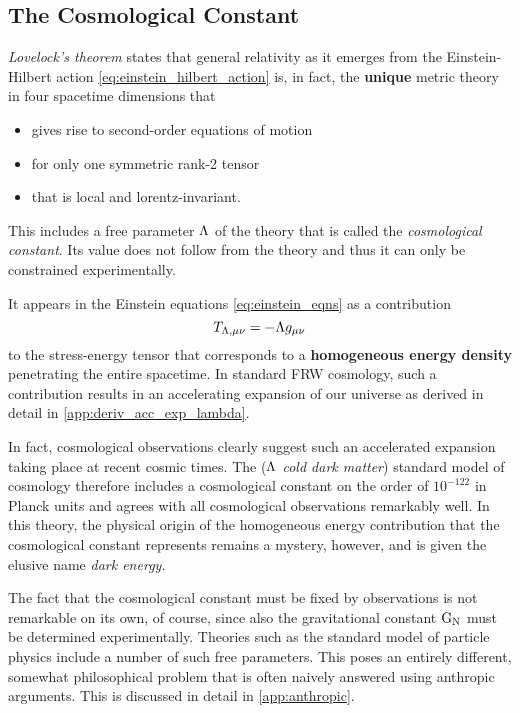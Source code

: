 \documentclass[parskip=half]{scrreprt}
\begin{document}
\subsection{The Cosmological Constant}\label{sec:cc_intro}

\emph{Lovelock's theorem}\label{sec:lovelock} states that general relativity as it emerges from the Einstein-Hilbert action \ref{eq:einstein_hilbert_action} is, in fact, the \textbf{unique} metric theory in four spacetime dimensions that 
\begin{itemize}
	\item gives rise to second-order equations of motion
	\item for only one symmetric rank-2 tensor
	\item that is local and lorentz-invariant.
\end{itemize}
This includes a free parameter \(\Lambda\) of the theory that is called the \emph{cosmological constant}. Its value does not follow from the theory and thus it can only be constrained experimentally.

It appears in the Einstein equations \ref{eq:einstein_eqns} as a contribution
\begin{equation}
	T_{\Lambda\textnormal{,}\mu\nu} = - \Lambda g_{\mu\nu}
\end{equation}
to the stress-energy tensor that corresponds to a \textbf{homogeneous energy density} penetrating the entire spacetime. In standard FRW cosmology, such a contribution results in an accelerating expansion of our universe as derived in detail in \autoref{app:deriv_acc_exp_lambda}.

In fact, cosmological observations clearly suggest such an accelerated expansion taking place at recent cosmic times.  The \cosmconstCDM (\emph{\(\Lambda\) cold dark matter}) standard model of cosmology therefore includes a cosmological constant on the order of \(10^{-122}\) in Planck units and agrees with all  cosmological observations remarkably well. In this theory, the physical origin of the homogeneous energy contribution that the cosmological constant represents remains a mystery, however, and is given the elusive  name \emph{dark energy}. 

The fact that the cosmological constant must be fixed by observations is not remarkable on its own, of course, since also the gravitational constant \(\mathrm{G}_\mathrm{N}\) must be determined experimentally. Theories such as the standard model of particle physics include a number of such free parameters. This poses an entirely different, somewhat philosophical problem that is often naively answered using anthropic arguments. This is discussed in detail in \autoref{app:anthropic}.
\end{document}
